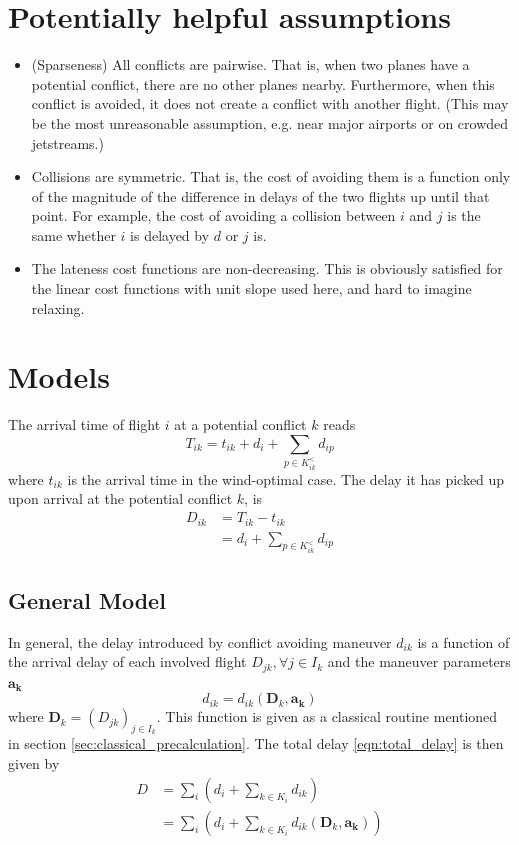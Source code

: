\documentclass{article}
\begin{document}
\section{Potentially helpful assumptions}
\begin{itemize}
\item (Sparseness) All conflicts are pairwise. That is, when two planes have a potential conflict, there are no other planes nearby. 
Furthermore, when this conflict is avoided, it does not create a conflict with another flight. 
(This may be the most unreasonable assumption, e.g. near major airports or on crowded jetstreams.)
\item Collisions are symmetric. That is, the cost of avoiding them is a function only of the magnitude of the difference in delays of the two flights up until that point. For example, the cost of avoiding a collision between $i$ and $j$ is the same whether $i$ is delayed by $d$ or $j$ is.
\item The lateness cost functions are non-decreasing.
This is obviously satisfied for the linear cost functions with unit slope used
here, and hard to imagine relaxing.
\end{itemize}

\section{Models}
The arrival time of flight $i$ at a potential conflict $k$ reads 
\begin{equation*}
    T_{ik} = t_{ik} + d_i + \sum_{p \in K^<_{ik}} d_{ip}
\end{equation*}
where $t_{ik}$ is the arrival time in the wind-optimal case.
The delay it has picked up upon arrival at the potential conflict $k$, is
\begin{align*}
    D_{ik} &= T_{ik} - t_{ik} \\
           &= d_i + \sum_{p \in K^<_{ik}} d_{ip}
\end{align*}

\subsection{General Model}
In general, the delay introduced by conflict avoiding maneuver $d_{ik}$ is a
function of the arrival delay of each involved flight $D_{jk}, \forall j \in
I_k$ and the maneuver parameters $\mathbf{a_k}$ \begin{equation}
\label{eqn:local_delay}
    d_{ik} = d_{ik}(\mathbf D_{k}, \mathbf{a_k}) 
\end{equation}
where $\mathbf D_k = (D_{jk})_{j \in I_k}$.
This function is given as a classical routine mentioned in section \ref{sec:classical_precalculation}.
The total delay \eqref{eqn:total_delay} is then given by
\begin{align*}
    D &= \sum_i \left(d_i + \sum_{k\in K_i} d_{ik}\right) \\
      &= \sum_i \left(d_i + \sum_{k\in K_i} d_{ik}(\mathbf D_{k}, \mathbf{a_k})\right) \\
\end{align*}
\end{document}
